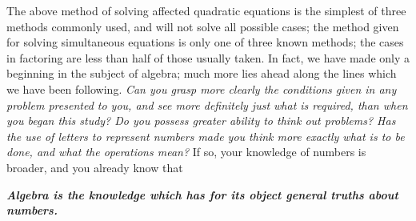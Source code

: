 \documentclass{book}
\begin{document}
The above method of solving affected quadratic equations is the
simplest of three methods commonly used, and will not solve all
possible cases; the method given for solving simultaneous
equations is only one of three known methods; the cases in
factoring are less than half of those usually taken. In fact, we
have made only a beginning in the subject of algebra; much more
lies ahead along the lines which we have been following. \textit{
Can you grasp more clearly the conditions given in any problem
presented to you, and see more definitely just what is required,
than when you began this study? Do you possess greater ability to
think out problems? Has the use of letters to represent numbers
made you think more exactly what is to be done, and what the
operations mean?} If so, your knowledge of numbers is broader, and
you already know that

\textbf{ \textit{ Algebra is the knowledge which has for its
object general truths about numbers.}}
\end{document}

